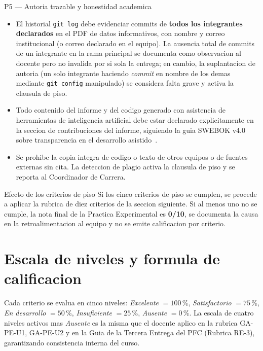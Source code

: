 \documentclass[11pt,a4paper]{article}
\begin{document}
\begin{cajacritica}{P5 --- Autoria trazable y honestidad academica}
    \begin{itemize}
        \item El historial \texttt{git log} debe evidenciar commits de \textbf{todos los integrantes declarados} en el PDF de datos informativos, con nombre y correo institucional (o correo declarado en el equipo). La ausencia total de commits de un integrante en la rama principal se documenta como observacion al docente pero no invalida por si sola la entrega; en cambio, la suplantacion de autoria (un solo integrante haciendo \emph{commit} en nombre de los demas mediante \texttt{git config} manipulado) se considera falta grave y activa la clausula de piso.
        \item Todo contenido del informe y del codigo generado con asistencia de herramientas de inteligencia artificial debe estar declarado explicitamente en la seccion de contribuciones del informe, siguiendo la guia SWEBOK v4.0 sobre transparencia en el desarrollo asistido~\cite{washizaki2024swebok}.
        \item Se prohibe la copia integra de codigo o texto de otros equipos o de fuentes externas sin cita. La deteccion de plagio activa la clausula de piso y se reporta al Coordinador de Carrera.
    \end{itemize}
\end{cajacritica}

\begin{cajadefinicion}{Efecto de los criterios de piso}
    Si los cinco criterios de piso se cumplen, se procede a aplicar la rubrica de diez criterios de la seccion siguiente. Si al menos uno no se cumple, la nota final de la Practica Experimental es \textbf{0/10}, se documenta la causa en la retroalimentacion al equipo y no se emite calificacion por criterio.
\end{cajadefinicion}

\section{Escala de niveles y formula de calificacion}

Cada criterio se evalua en cinco niveles: \emph{Excelente} $= 100$\,\%, \emph{Satisfactorio} $= 75$\,\%, \emph{En desarrollo} $= 50$\,\%, \emph{Insuficiente} $= 25$\,\%, \emph{Ausente} $= 0$\,\%. La escala de cuatro niveles activos mas \emph{Ausente} es la misma que el docente aplico en la rubrica GA-PE-U1, GA-PE-U2 y en la Guia de la Tercera Entrega del PFC (Rubrica RE-3), garantizando consistencia interna del curso.
\end{document}
